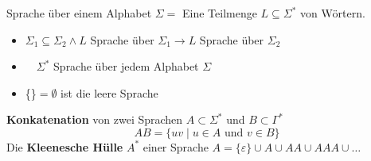 \begin{definition}{Sprache}
    über einem Alphabet $\Sigma=$ Eine Teilmenge $L \subseteq \Sigma^{*}$ von Wörtern.
    \begin{itemize}
    \item $\Sigma_{1} \subseteq \Sigma_{2} \wedge L$ Sprache über $\Sigma_{1} \rightarrow L$ Sprache über $\Sigma_{2}$
    \item $\quad \Sigma^{*}$ Sprache über jedem Alphabet $\Sigma$
    \item \{\}$=\emptyset$ ist die leere Sprache
    \end{itemize}
    \textbf{Konkatenation} von zwei Sprachen $A \subset \Sigma^{*}$ und $B \subset \Gamma^{*}$
    $$
    A B=\{u v \mid u \in A \text { und } v \in B\}
    $$
    Die \textbf{Kleenesche Hülle} $A^{*}$ einer Sprache $A=\{\varepsilon\} \cup A \cup A A \cup A A A \cup \ldots$
\end{definition}